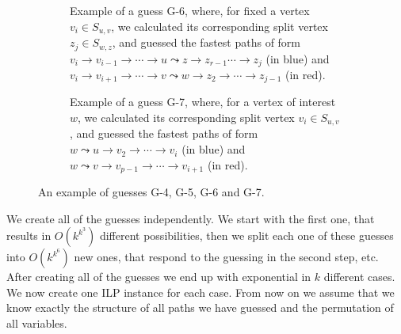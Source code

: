 \documentclass[11pt,a4paper]{article}
\theoremstyle{remark}
\theoremstyle{definition}
\begin{document}
\begin{figure}[ht]
\begin{subfigure}[b]{0.48\textwidth}
{\begin{tikzpicture}[scale=1]
					
			\end{tikzpicture}}
			\caption{Example of a guess G-6, where, for fixed a vertex $v_i \in S_{u,v}$,
				we calculated its corresponding split vertex $z_j \in S_{w,z}$,
				and guessed the fastest paths of form
				$v_i \rightarrow v_{i-1} \rightarrow \cdots \rightarrow u \leadsto z \rightarrow z_{r-1} \cdots \rightarrow z_j$ (in blue) 
				and $v_i \rightarrow v_{i+1} \rightarrow \cdots \rightarrow v \leadsto w \rightarrow z_2 \rightarrow \cdots \rightarrow z_{j-1}$ (in red). 
				\label{fig:FPT-guessG6}}
		\end{subfigure}
	\quad
	\begin{subfigure}[b]{0.48\textwidth}
		\centering
	\caption{Example of a guess G-7, where, for a vertex of interest $w$, 
		we
		calculated its corresponding split vertex $v_i \in S_{u,v}$,
		and guessed the fastest paths of form
		$w \leadsto u \rightarrow v_2 \rightarrow \cdots \rightarrow v_i$  (in blue) 
		and $w \leadsto v \rightarrow v_{p-1} \rightarrow \cdots \rightarrow v_{i+1}$ (in red). 
		\label{fig:FPT-guessG7}}
	\end{subfigure}
\caption{An example of guesses G-4, G-5, G-6 and G-7.}
\end{figure}
%
We create all of the guesses independently.
We start with the first one, that results in $O(k^{k^3})$ different possibilities, then we split each one of these guesses into $O(k^{k^6})$ new ones, that respond to the guessing in the second step, etc.
After creating all of the guesses we end up with exponential in $k$ different cases.
We now create one ILP instance for each case.
From now on we assume that we know exactly the structure of all paths we have guessed and the permutation of all variables.
\end{document}
